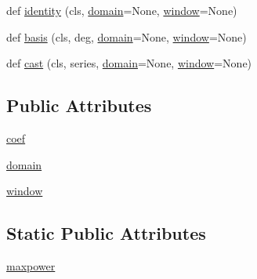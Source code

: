 \begin{DoxyCompactItemize}
\item 
def \hyperlink{classnumpy_1_1polynomial_1_1__polybase_1_1ABCPolyBase_ab9e8e72a70d5069aecc418fd3b3d1d42}{identity} (cls, \hyperlink{classnumpy_1_1polynomial_1_1__polybase_1_1ABCPolyBase_aaf29f269a505cdb48cc84467414a497b}{domain}=None, \hyperlink{classnumpy_1_1polynomial_1_1__polybase_1_1ABCPolyBase_a193a5e19ba940ca6b5a441151c0278e4}{window}=None)
\item 
def \hyperlink{classnumpy_1_1polynomial_1_1__polybase_1_1ABCPolyBase_a22d6db48b287afde7a31f394cfc1ed81}{basis} (cls, deg, \hyperlink{classnumpy_1_1polynomial_1_1__polybase_1_1ABCPolyBase_aaf29f269a505cdb48cc84467414a497b}{domain}=None, \hyperlink{classnumpy_1_1polynomial_1_1__polybase_1_1ABCPolyBase_a193a5e19ba940ca6b5a441151c0278e4}{window}=None)
\item 
def \hyperlink{classnumpy_1_1polynomial_1_1__polybase_1_1ABCPolyBase_a5ba30a478c40f03ea67c4b16f38f91d0}{cast} (cls, series, \hyperlink{classnumpy_1_1polynomial_1_1__polybase_1_1ABCPolyBase_aaf29f269a505cdb48cc84467414a497b}{domain}=None, \hyperlink{classnumpy_1_1polynomial_1_1__polybase_1_1ABCPolyBase_a193a5e19ba940ca6b5a441151c0278e4}{window}=None)
\end{DoxyCompactItemize}
\subsection*{Public Attributes}
\begin{DoxyCompactItemize}
\item 
\hyperlink{classnumpy_1_1polynomial_1_1__polybase_1_1ABCPolyBase_abc32ea31245612c296b11a3dcca1e922}{coef}
\item 
\hyperlink{classnumpy_1_1polynomial_1_1__polybase_1_1ABCPolyBase_aaf29f269a505cdb48cc84467414a497b}{domain}
\item 
\hyperlink{classnumpy_1_1polynomial_1_1__polybase_1_1ABCPolyBase_a193a5e19ba940ca6b5a441151c0278e4}{window}
\end{DoxyCompactItemize}
\subsection*{Static Public Attributes}
\begin{DoxyCompactItemize}
\item 
\hyperlink{classnumpy_1_1polynomial_1_1__polybase_1_1ABCPolyBase_a675672fcb0d26d92f791203dbe093768}{maxpower}
\end{DoxyCompactItemize}


